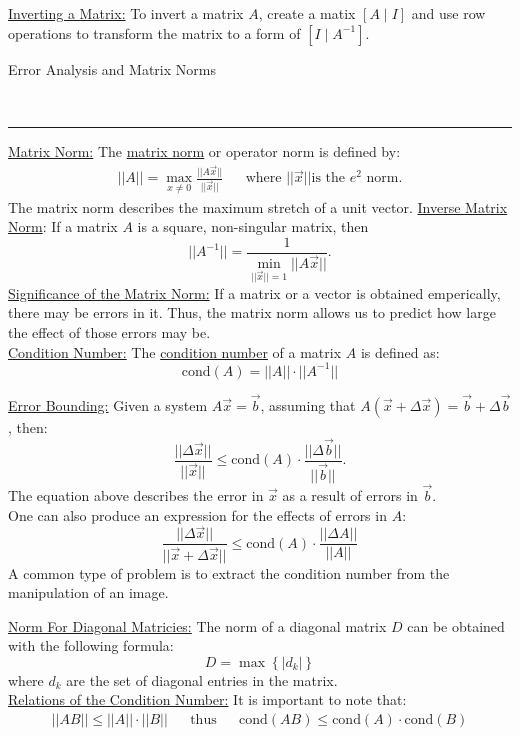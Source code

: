 \documentclass{article}
\newcommand{\header}[1]{\begin{large}\noindent #1\end{large}\\\rule{\textwidth}{0.5pt}}
\newcommand{\gap}{\medskip\\}
\begin{document}
    \underline{Inverting a Matrix:} To invert a matrix $A$, create a matix $[A \mid I]$ and
    use row operations to transform the matrix to a form of $[I \mid A^{-1}]$.
\gap
\header{Error Analysis and Matrix Norms}

\underline{Matrix Norm:} The \underline{matrix norm} or operator norm is defined by:
\begin{align*}
    ||A|| = \max_{x \neq 0} \frac{||A\vec{x}||}{||\vec{x}||} && \textrm{where } ||\vec{x}|| \textrm{is the } e^2 \textrm{ norm}.
\end{align*}
The matrix norm describes the maximum stretch of a unit vector.
\underline{Inverse Matrix Norm}: If a matrix $A$ is a square, non-singular matrix, then
\[
    ||A^{-1}|| = \frac{1}{\min_{||\vec{x}|| = 1}||A\vec{x}||}.
\]
\underline{Significance of the Matrix Norm:} If a matrix or a vector is obtained
emperically, there may be errors in it. Thus, the matrix norm allows us to predict
how large the effect of those errors may be.
\gap
\underline{Condition Number:} The \underline{condition number} of a matrix $A$ is 
defined as:
\[
    \textrm{cond}(A) = ||A||\cdot||A^{-1}||
\]

\underline{Error Bounding:} Given a system $A\vec{x} = \vec{b}$, assuming that
$A(\vec{x} + \Delta\vec{x}) = \vec{b} + \Delta \vec{b}$, then:
\[
    \frac{||\Delta\vec{x}||}{||\vec{x}||} \leq \textrm{cond}(A) \cdot \frac{||\Delta \vec{b}||}{||\vec{b}||}.
\]
The equation above describes the error in $\vec{x}$ as a result of errors in $\vec{b}$.
\gap
One can also produce an expression for the effects of errors in $A$:
\[
    \frac{||\Delta \vec{x}||}{||\vec{x} + \Delta \vec{x}||} \leq \textrm{cond}(A) \cdot \frac{||\Delta A||}{||A||}  
\]
A common type of problem is to extract the condition number from the manipulation of
an image.

\underline{Norm For Diagonal Matricies:} The norm of a diagonal matrix $D$ can be obtained
with the following formula:
\[
    D = \max\left\{|d_k|\right\}
\]
where $d_k$ are the set of diagonal entries in the matrix.
\gap
\underline{Relations of the Condition Number:} It is important to note that:
\begin{align*}
    ||AB|| \leq ||A||\cdot||B|| && \textrm{thus} && \textrm{cond}(AB) \leq \textrm{cond}(A) \cdot \textrm{cond}(B)
\end{align*}
\end{document}
